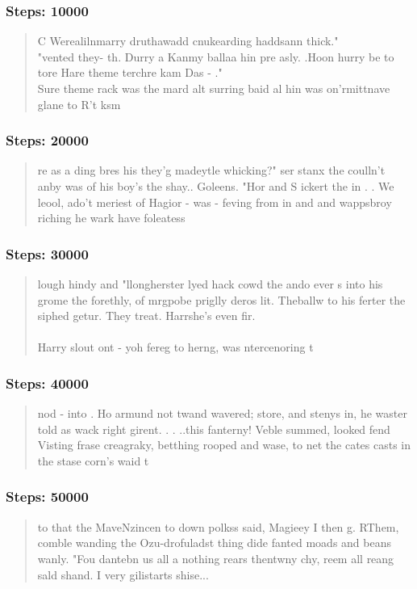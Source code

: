 \documentclass{article}
\begin{document}
\subsubsection*{Steps: 10000}
\begin{quote} 
	\smaller
	C Werealilnmarry druthawadd cnukearding haddsann thick."\\
	"vented they- th. Durry a Kanmy ballaa hin pre asly. .Hoon hurry be to tore Hare theme terchre kam Das - ."\\
	Sure theme rack was the mard alt surring baid al hin was on'rmittnave glane to R't ksm
\end{quote}

\subsubsection*{Steps: 20000}
\begin{quote} 
	\smaller
	re as a ding bres his they'g madeytle whicking?" ser stanx the coulln't anby was of his boy's the shay.. Goleens.  "Hor and S ickert the in . .  We leool, ado't meriest of Hagior - was - feving from in and and wappsbroy riching he wark have foleatess
\end{quote}

\subsubsection*{Steps: 30000}
\begin{quote} 
	\smaller
	lough hindy and "llongherster lyed hack cowd the ando ever s into his grome the forethly, of mrgpobe priglly deros lit.  Theballw to his ferter the siphed getur. They treat.
	Harrshe's even fir.\\\\
	Harry slout ont - yoh fereg to herng, was ntercenoring t
\end{quote}

\subsubsection*{Steps: 40000}
\begin{quote}
	\smaller
	nod - into .  Ho armund not twand wavered; store, and stenys in, he waster told as wack right girent. . . ..this fanterny!  Veble summed, looked  fend Visting frase creagraky, 		betthing rooped and wase, to net the cates casts in the stase corn's waid t
\end{quote}

\subsubsection*{Steps: 50000}
\begin{quote}
	\smaller
	to that the MaveNzincen to down polkss said, Magieey I then g. RThem, comble wanding the Ozu-drofuladst thing dide fanted moads and beans wanly.
	"Fou dantebn us all a nothing rears thentwny chy, reem all reang sald shand.  I very gilistarts shise...
\end{quote}
\end{document}
